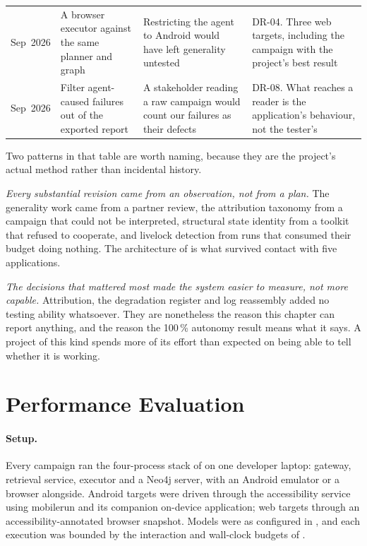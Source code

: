 \begin{xltabular}{\textwidth}{@{}>{\hsize}Y>{\hsize}Y>{\hsize}Y>{\hsize}Y@{}}
  \addlinespace
  \mbox{Sep 2026} & A browser executor against the same planner and graph & Restricting the agent to Android would have left generality untested & DR-04. Three web targets, including the campaign with the project's best result \\
  \addlinespace
  \mbox{Sep 2026} & Filter agent-caused failures out of the exported report & A stakeholder reading a raw campaign would count our failures as their defects & DR-08. What reaches a reader is the application's behaviour, not the tester's \\
  \bottomrule
\end{xltabular}
\endgroup

Two patterns in that table are worth naming, because they are the project's
actual method rather than incidental history.

\emph{Every substantial revision came from an observation, not from a plan.}
The generality work came from a partner review, the attribution taxonomy from a
campaign that could not be interpreted, structural state identity from a
toolkit that refused to cooperate, and livelock detection from runs that
consumed their budget doing nothing. The architecture of  is
what survived contact with five applications.

\emph{The decisions that mattered most made the system easier to measure, not
more capable.} Attribution, the degradation register and log reassembly added
no testing ability whatsoever. They are nonetheless the reason this chapter can
report anything, and the reason the 100\,\% autonomy result means what it says.
A project of this kind spends more of its effort than expected on being able to
tell whether it is working.

\section{Performance Evaluation}
\label{sec:evaluation}

\paragraph{Setup.} Every campaign ran the four-process stack of
 on one developer laptop: gateway, retrieval service,
executor and a Neo4j server, with an Android emulator or a browser alongside.
Android targets were driven through the accessibility service using mobilerun
and its companion on-device application; web targets through an
accessibility-annotated browser snapshot. Models were as configured in
, and each execution was bounded by the interaction and
wall-clock budgets of .

